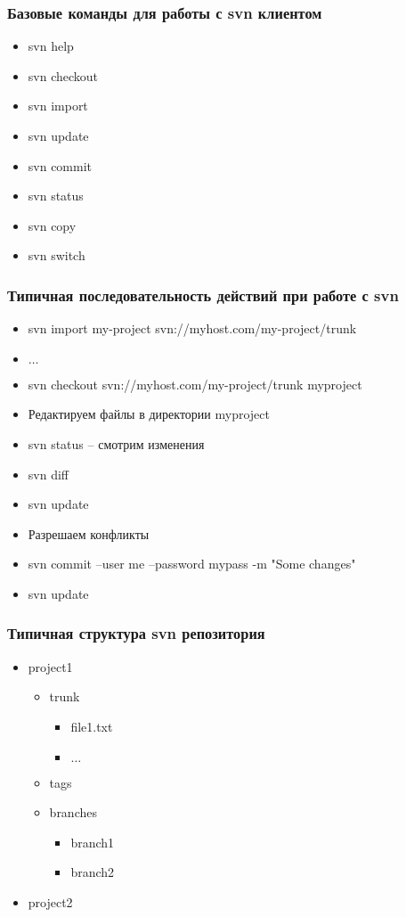 \begin{frame}
 \frametitle{Базовые команды для работы с svn клиентом}
  \begin{itemize}
   \item svn help
   \item svn checkout 
   \item svn import
   \item svn update
   \item svn commit
   \item svn status
   \item svn copy
   \item svn switch
  \end{itemize}
\end{frame}

\begin{frame}
 \frametitle{Типичная последовательность действий при работе с svn}
 \begin{itemize}
  \item svn import my-project svn://myhost.com/my-project/trunk
  \item $\dots$
  \item svn checkout svn://myhost.com/my-project/trunk myproject
  \item Редактируем файлы в директории myproject
  \item svn status -- смотрим изменения
  \item svn diff
  \item svn update 
  \item Разрешаем конфликты
  \item svn commit --user me --password mypass -m "Some changes"
  \item svn update
 \end{itemize}
\end{frame}

\begin{frame}
 \frametitle{Типичная структура svn репозитория}
 \begin{itemize}
  \item project1
    \begin{itemize}
      \item trunk
        \begin{itemize}
          \item file1.txt
          \item $\dots$
        \end{itemize}
      \item tags
      \item branches
         \begin{itemize}
            \item branch1
            \item branch2
         \end{itemize}
    \end{itemize}
  \item project2

 \end{itemize}
\end{frame}

